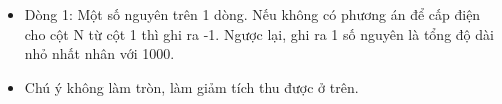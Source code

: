 \begin{itemize}
	\item     Dòng 1: Một số nguyên trên 1 dòng. Nếu không có phương án để cấp điện cho cột N từ          cột 1 thì ghi ra -1. Ngược lại, ghi ra 1 số nguyên là tổng độ dài nhỏ nhất nhân với 1000.   
	\item     Chú ý không làm tròn, làm giảm tích thu được ở trên.   
\end{itemize}
